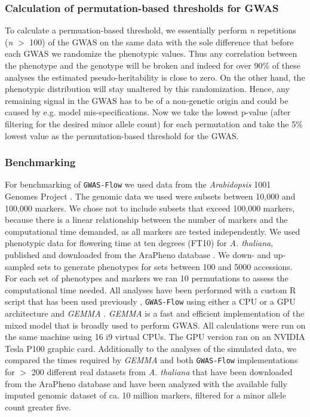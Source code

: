 \subsubsection{Calculation of permutation-based thresholds for GWAS}

To calculate a permuation-based threshold, we essentially perform \textit{n} repetitions (\textit{n} $>$ 100) of the GWAS on the
same data with the sole difference that before each GWAS we randomize the phenotypic values. Thus any correlation between the
phenotype and the genotype will be broken and indeed for over 90\% of these analyses the estimated pseudo-heritability is close
to zero. On the other hand, the phenotypic distribution will stay unaltered by this randomization. Hence, any remaining signal
in the GWAS has to be of a non-genetic origin and could be caused by e.g. model mis-specifications. Now we take the lowest p-value
(after filtering for the desired minor allele count) for each permutation and take the 5\% lowest value as the permutation-based
threshold for the GWAS.

\subsubsection{Benchmarking}
For benchmarking of \texttt{GWAS-Flow} we used data from the \textit{Arabidopsis} 1001 Genomes Project \cite{1001genome}. The
genomic data we used were subsets between 10,000 and 100,000 markers. We chose not to include subsets that exceed 100,000 markers,
because there is a linear relationship between the number of markers and the computational time demanded, as all markers are tested
independently. We used phenotypic data for flowering time at ten degrees (FT10) for \textit{A. thaliana}, published and downloaded
from the AraPheno database \cite{seren2016arapheno}. We down- and up-sampled sets to generate phenotypes for sets between 100 and 5000
accessions.
For each set of phenotypes and markers we ran 10 permutations to assess the computational time needed. All analyses have been performed
with a custom R script that has been used previously \cite{togninalli2017aragwas}, \texttt{GWAS-Flow} using either a CPU or a GPU
architecture and \textit{GEMMA} \cite{Zhou2012}. \textit{GEMMA} is a fast and efficient implementation of the mixed model that is
broadly used to perform GWAS.
All calculations were run on the same machine using 16 i9 virtual CPUs. The GPU version ran on an NVIDIA Tesla P100 graphic card.
Additionally to the analyses of the simulated data, we compared the times required by \textit{GEMMA} and both \texttt{GWAS-Flow}
implementations for $>$ 200 different real datasets from \textit{A. thaliana} that have been downloaded from the AraPheno
\cite{seren2016arapheno} database and have been analyzed with the available fully imputed genomic dataset of ca. 10 million markers,
filtered for a minor allele count greater five. 

